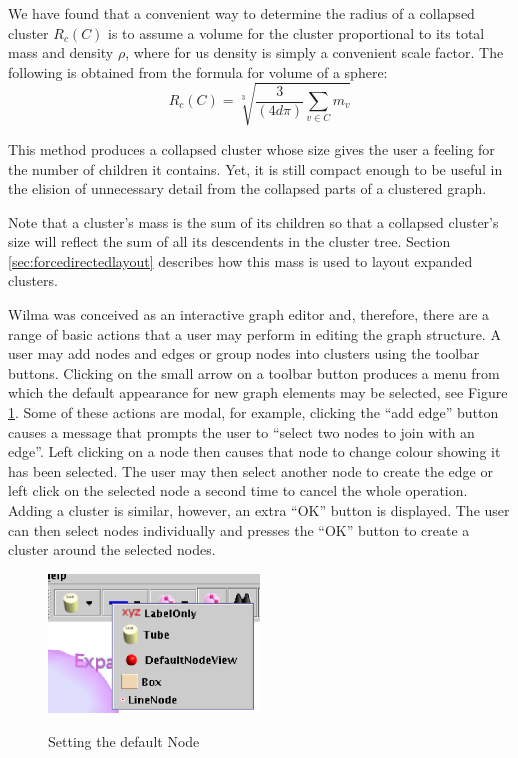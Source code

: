 \documentclass[runningheads]{cl2emult}
\begin{document}
We have found that a convenient way to determine the radius of a collapsed cluster
$R_c(C)$ is to assume a volume for the cluster proportional to its
total mass and density $\rho$, where for us density is simply a convenient scale
factor.  The following is obtained from the formula for volume of a
sphere:
\[R_c(C) = \sqrt[3]{\frac{3}{(4d\pi)}\sum_{v \in C}m_v} \] 

This method produces a collapsed cluster whose size gives the user a
feeling for the number of children it contains.  Yet, it is still
compact enough to be useful in the elision of unnecessary detail from
the collapsed parts of a clustered graph.

Note that a cluster's mass is the sum of its children so that a
collapsed cluster's size will reflect the sum of all its descendents
in the cluster tree.  Section \ref{sec:forcedirectedlayout} describes
how this mass is used to layout expanded clusters.

Wilma was conceived as an interactive graph editor and, therefore, there
are a range of basic actions that a user may perform in editing the
graph structure.  A user may add nodes and edges or group nodes into
clusters using the toolbar buttons.  Clicking on the small arrow on a
toolbar button produces a menu from which the default appearance for
new 
graph elements may be selected, see Figure
\ref{fig-defaultnode}.
Some of these actions are modal, for example, clicking the ``add
edge'' button causes a message that prompts the user to ``select two
nodes to join with an edge''.  Left clicking on a node then causes that node
to change colour showing it has been selected.  The user may then
select another node to create the edge or left click on the selected node a
second time to cancel the whole operation.  Adding a cluster is
similar, however, an extra ``OK'' button is displayed.  The user can
then select nodes individually and presses the ``OK'' button to create
a cluster around the selected nodes.
\begin{figure}
\begin{center}
  \label{fig-defaultnode}
  \includegraphics[width=0.5\textwidth]{figures/defaultnode.eps}
  \caption{Setting the default Node}
\end{center}
\end{figure}
\end{document}
